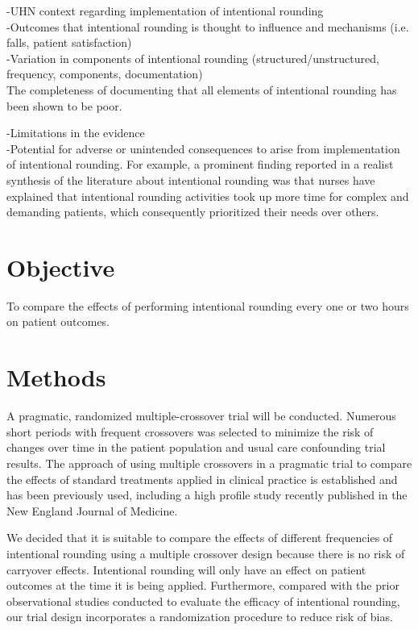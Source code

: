 \documentclass[12pt]{article}
\begin{document}
-UHN context regarding implementation of intentional rounding\\
-Outcomes that intentional rounding is thought to influence and mechanisms (i.e. falls, patient satisfaction)\\
-Variation in components of intentional rounding (structured/unstructured, frequency, components, documentation)\\


The completeness of documenting that all elements of intentional rounding has been shown to be poor.\cite{tucker2012outcomes}

-Limitations in the evidence\\

-Potential for adverse or unintended consequences to arise from implementation of intentional rounding. For example, a prominent finding reported in a realist synthesis of the literature about intentional rounding was that  nurses have explained that intentional rounding activities took up more time for complex and demanding patients, which consequently prioritized their needs over others.\cite{sims2018realist}

\section{Objective}
To compare the effects of performing intentional rounding every one or two hours on patient outcomes. 

\section{Methods}

A pragmatic, randomized multiple-crossover trial will be conducted. Numerous short periods with frequent crossovers was selected to minimize the risk of changes over time in the patient population and usual care confounding trial results. The approach of using multiple crossovers in a pragmatic trial to compare the effects of standard treatments applied in clinical practice is established and has been previously used, including a high profile study recently published in the New England Journal of Medicine.\cite{self2018} 


We decided that it is suitable to compare the effects of different frequencies of intentional rounding using a multiple crossover design because there is no risk of carryover effects. Intentional rounding will only have an effect on patient outcomes at the time it is being applied. Furthermore, compared with the prior observational studies conducted to evaluate the efficacy of intentional rounding, our trial design incorporates a randomization procedure to reduce risk of bias.
\end{document}
